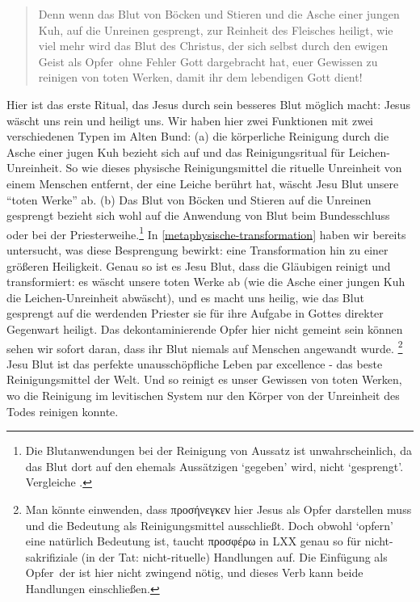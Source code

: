 \begin{quote}
Denn wenn das Blut von Böcken und Stieren und die Asche einer jungen Kuh, auf die Unreinen gesprengt, zur Reinheit des Fleisches heiligt,
wie viel mehr wird das Blut des Christus, der sich selbst durch den ewigen Geist \textlangle als Opfer\textrangle\ ohne Fehler Gott dargebracht hat,
euer Gewissen zu reinigen von toten Werken, damit ihr dem lebendigen Gott dient!
\end{quote}
Hier ist das erste Ritual, das Jesus durch sein besseres Blut möglich macht: Jesus wäscht uns rein und heiligt uns.
Wir haben hier zwei Funktionen mit zwei verschiedenen Typen im Alten Bund:
(a) die körperliche Reinigung durch die Asche einer jugen Kuh bezieht sich auf  und das Reinigungsritual für Leichen-Unreinheit.
So wie dieses physische Reinigungsmittel die rituelle Unreinheit von einem Menschen entfernt, der eine Leiche berührt hat, wäscht Jesu Blut unsere ``toten Werke''
ab.
(b) Das Blut von Böcken und Stieren auf die Unreinen gesprengt bezieht sich wohl auf die Anwendung von Blut beim Bundesschluss oder bei der Priesterweihe.\footnote{
	Die Blutanwendungen bei der Reinigung von Aussatz ist unwahrscheinlich, da das Blut dort auf den ehemals Aussätzigen `gegeben' wird, nicht `gesprengt'.
	Vergleiche .
}
In \ref{metaphysische-transformation} haben wir bereits untersucht, was diese Besprengung bewirkt: eine Transformation hin zu einer größeren Heiligkeit.
Genau so ist es Jesu Blut, dass die Gläubigen reinigt und transformiert: es wäscht unsere toten Werke ab (wie die Asche einer jungen Kuh die Leichen-Unreinheit abwäscht),
und es macht uns heilig, wie das Blut gesprengt auf die werdenden Priester sie für ihre Aufgabe in Gottes direkter Gegenwart heiligt.
Das dekontaminierende Opfer hier nicht gemeint sein können sehen wir sofort daran, dass ihr Blut niemals auf Menschen angewandt wurde.
\footnote{Man könnte einwenden, dass προσήνεγκεν hier Jesus als Opfer darstellen muss und die Bedeutung als Reinigungsmittel ausschließt.
	Doch obwohl `opfern' eine natürlich Bedeutung ist, taucht προσφέρω in LXX genau so für nicht-sakrifiziale (in der Tat: nicht-rituelle) Handlungen auf.
	Die Einfügung \textlangle als Opfer\textrangle\ der \Cite{elb} ist hier nicht zwingend nötig, und dieses Verb kann beide Handlungen einschließen.
}
Jesu Blut ist das perfekte unausschöpfliche Leben par excellence - das beste Reinigungsmittel der Welt.
Und so reinigt es unser Gewissen von toten Werken, wo die Reinigung im levitischen System nur den Körper von der Unreinheit des Todes reinigen konnte.
